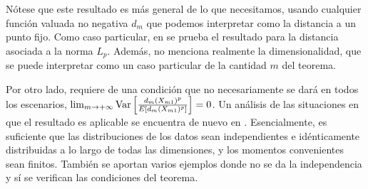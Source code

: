 Nótese que este resultado es más general de lo que necesitamos, usando
cualquier función valuada no negativa \(d_m\) que podemos interpretar
como la distancia a un punto fijo. Como caso particular, en
\textcite{aggarwal2001} se prueba el resultado para la distancia
asociada a la norma \(L_p\). Además, no menciona realmente la
dimensionalidad, que se puede interpretar como un caso particular de la
cantidad \(m\) del teorema.

Por otro lado, requiere de una condición que no necesariamente se dará
en todos los escenarios,
\(\lim_{m\rightarrow +\infty}\mathrm{Var}\left[\frac{d_m(X_{m1})^p}{E[d_m(X_{m1})^p]}\right]=0\).
Un análisis de las situaciones en que el resultado es aplicable se
encuentra de nuevo en \textcite{beyer1999}. Esencialmente, es suficiente
que las distribuciones de los datos sean independientes e idénticamente
distribuidas a lo largo de todas las dimensiones, y los momentos
convenientes sean finitos. También se aportan varios ejemplos donde no se
da la independencia y sí se verifican las condiciones del teorema.
